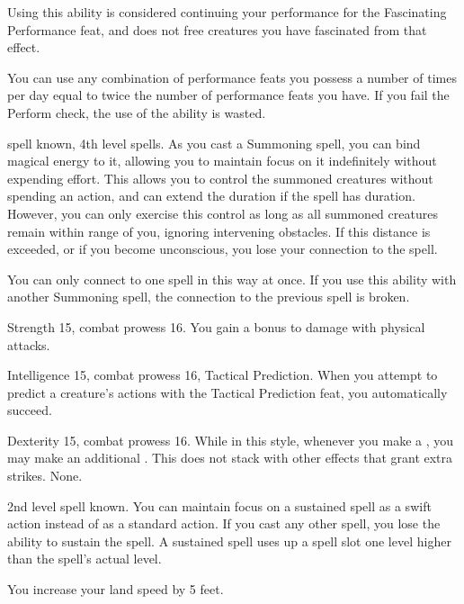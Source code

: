 Using this ability is considered continuing your performance for the Fascinating Performance feat, and does not free creatures you have fascinated from that effect.

 You can use any combination of performance feats you possess a number of times per day equal to twice the number of performance feats you have.
If you fail the Perform check, the use of the ability is wasted.

\featpres {} spell known, 4th level spells.
\featben As you cast a Summoning spell, you can bind magical energy to it, allowing you to maintain focus on it indefinitely without expending effort.
This allows you to control the summoned creatures without spending an action, and can extend the duration if the spell has \durshort duration.
However, you can only exercise this control as long as all summoned creatures remain within \rnglong range of you, ignoring intervening obstacles.
If this distance is exceeded, or if you become unconscious, you lose your connection to the spell.

You can only connect to one spell in this way at once.
If you use this ability with another Summoning spell, the connection to the previous spell is broken.

\featpres Strength 15, combat prowess 16.
\featben You gain a  bonus to damage with physical attacks.

\featpres Intelligence 15, combat prowess 16, Tactical Prediction.
\featben When you attempt to predict a creature's actions with the Tactical Prediction feat, you automatically succeed.

\featpres Dexterity 15, combat prowess 16.
\featben While in this style, whenever you make a , you may make an additional .
This does not stack with other effects that grant extra strikes.
\stylereq None.

\featpre 2nd level spell known.
\featben You can maintain focus on a sustained spell as a swift action instead of as a standard action.
If you cast any other spell, you lose the ability to sustain the spell.
A sustained spell uses up a spell slot one level higher than the spell's actual level.

\featben You increase your land speed by 5 feet.

